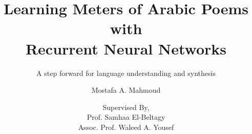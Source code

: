 \title[Learning Meters of Arabic Poems] %
{Learning Meters of Arabic Poems with \\ Recurrent Neural Networks}

\subtitle{A step forward
	for language understanding and synthesis}

\author[Moustafa A. Mahmoud] %
{Mostafa A. Mahmoud  
}



\date[\today] %
{Supervised By, \\ Prof. Samhaa El-Beltagy \\ Assoc. Prof. Waleed A. Yousef}



